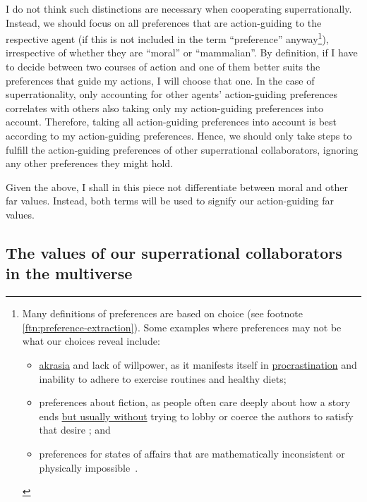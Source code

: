 I do not think such distinctions are necessary when cooperating
superrationally. Instead, we should focus on all preferences that are
action-guiding to the respective agent (if this is not included in the
term ``preference'' anyway\footnote{Many definitions of preferences are
    based on choice (see footnote \ref{ftn:preference-extraction}). 
  Some examples where preferences
  may not be what our choices reveal include:
  \begin{itemize}
  \item
  \href{https://en.wikipedia.org/wiki/Akrasia}{akrasia} and lack
  of willpower, as it manifests itself in
  \href{https://en.wikipedia.org/wiki/Procrastination}{procrastination}
  and inability to adhere to exercise routines and healthy diets;

  \item
  preferences about fiction, as people often care deeply about how a
  story ends
  \href{http://briantomasik.com/collection-quick-observations/\#Taking_fiction_seriously}{but
  usually without} trying to lobby or coerce the authors to satisfy
  that desire
  \parencite{Radford1975-my,noauthor_undated-sw}; and

  \item preferences for states of affairs that are mathematically inconsistent
  or physically impossible~\parencite{Oesterheld2017}. 
  \end{itemize}
  }), irrespective of whether they are ``moral'' or
``mammalian''. By definition, if I have to decide between two courses of
action and one of them better suits the preferences that guide my
actions, I will choose that one. In the case of superrationality, only
accounting for other agents' action-guiding preferences correlates with
others also taking only my action-guiding preferences into account.
Therefore, taking all action-guiding preferences into account is best
according to my action-guiding preferences. Hence, we should only take
steps to fulfill the action-guiding preferences of other superrational
collaborators, ignoring any other preferences they might hold.

Given the above, I shall in this piece not differentiate between moral
and other far values. Instead, both terms will be used to signify our
action-guiding far values.

\hypertarget{the-values-of-our-superrational-collaborators-in-the-multiverse}{\subsection{The
values of our superrational collaborators in the
multiverse}\label{the-values-of-our-superrational-collaborators-in-the-multiverse}}

